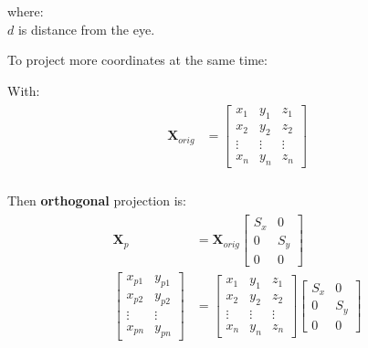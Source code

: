 \documentclass[10pt,b5paper,titlepage]{book}
\begin{document}
where: \\
$ d $ is distance from the eye.

To project more coordinates at the same time:

With:
\begin{eqnarray}
    \begin{aligned}
        \mathbf{X}_{orig} &=
        \begin{bmatrix}
            x_1 & y_1 & z_1 \\
            x_2 & y_2 & z_2 \\
            \vdots & \vdots & \vdots \\
            x_n & y_n & z_n
        \end{bmatrix}
    \end{aligned}
\end{eqnarray}
\\
Then \textbf{orthogonal} projection is:
\begin{eqnarray}
    \begin{aligned}
        \mathbf{X}_p &= \mathbf{X}_{orig}
        \begin{bmatrix}
            S_x & 0 \\
            0 & S_y \\
            0 & 0
        \end{bmatrix} \\
        \begin{bmatrix}
            x_{p1} & y_{p1} \\
            x_{p2} & y_{p2} \\
            \vdots & \vdots \\
            x_{pn} & y_{pn}
        \end{bmatrix}
        &=
        \begin{bmatrix}
            x_1 & y_1 & z_1 \\
            x_2 & y_2 & z_2 \\
            \vdots & \vdots & \vdots \\
            x_n & y_n & z_n
        \end{bmatrix}
        \begin{bmatrix}
            S_x & 0 \\
            0 & S_y \\
            0 & 0
        \end{bmatrix}
    \end{aligned}
\end{eqnarray}
\end{document}
